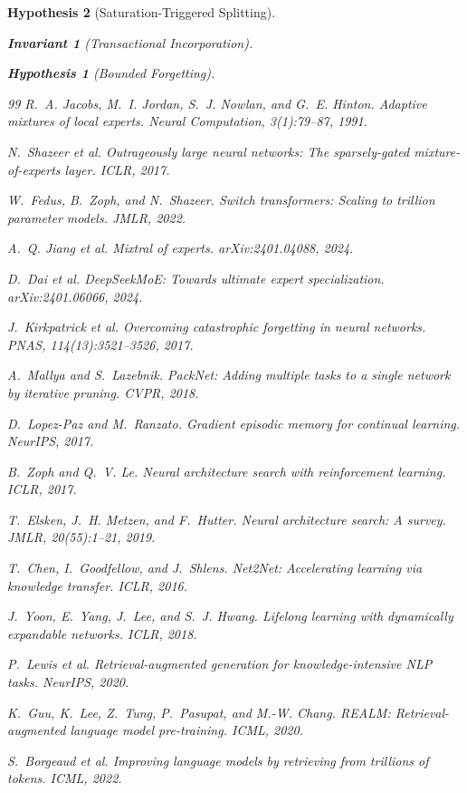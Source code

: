 \documentclass[11pt,a4paper]{article}
\newtheorem{invariant}{Invariant}
\newtheorem{hypothesis}{Hypothesis}
\begin{document}
\begin{hypothesis}[Saturation-Triggered Splitting]
\begin{invariant}[Transactional Incorporation]
\begin{hypothesis}[Bounded Forgetting]
\begin{thebibliography}{99}
R.~A. Jacobs, M.~I. Jordan, S.~J. Nowlan, and G.~E. Hinton.
Adaptive mixtures of local experts. \textit{Neural Computation},
3(1):79--87, 1991.

N.~Shazeer et al. Outrageously large neural networks: The
sparsely-gated mixture-of-experts layer. \textit{ICLR}, 2017.

W.~Fedus, B.~Zoph, and N.~Shazeer. Switch transformers:
Scaling to trillion parameter models. \textit{JMLR}, 2022.

A.~Q. Jiang et al. Mixtral of experts. \textit{arXiv:2401.04088}, 2024.

D.~Dai et al. DeepSeekMoE: Towards ultimate expert specialization.
\textit{arXiv:2401.06066}, 2024.

J.~Kirkpatrick et al. Overcoming catastrophic forgetting in
neural networks. \textit{PNAS}, 114(13):3521--3526, 2017.

A.~Mallya and S.~Lazebnik. PackNet: Adding multiple tasks to a
single network by iterative pruning. \textit{CVPR}, 2018.

D.~Lopez-Paz and M.~Ranzato. Gradient episodic memory for
continual learning. \textit{NeurIPS}, 2017.

B.~Zoph and Q.~V. Le. Neural architecture search with
reinforcement learning. \textit{ICLR}, 2017.

T.~Elsken, J.~H. Metzen, and F.~Hutter. Neural architecture
search: A survey. \textit{JMLR}, 20(55):1--21, 2019.

T.~Chen, I.~Goodfellow, and J.~Shlens. Net2Net: Accelerating
learning via knowledge transfer. \textit{ICLR}, 2016.

J.~Yoon, E.~Yang, J.~Lee, and S.~J. Hwang. Lifelong learning
with dynamically expandable networks. \textit{ICLR}, 2018.

P.~Lewis et al. Retrieval-augmented generation for
knowledge-intensive NLP tasks. \textit{NeurIPS}, 2020.

K.~Guu, K.~Lee, Z.~Tung, P.~Pasupat, and M.-W. Chang.
REALM: Retrieval-augmented language model pre-training.
\textit{ICML}, 2020.

S.~Borgeaud et al. Improving language models by retrieving from
trillions of tokens. \textit{ICML}, 2022.


\end{thebibliography}
\end{hypothesis}
\end{invariant}
\end{hypothesis}
\end{document}
